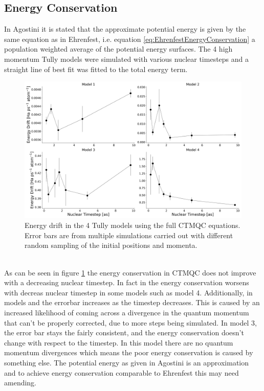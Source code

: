 \subsection{Energy Conservation}
In Agostini \cite{agostini_quantum-classical_2016} it is stated that the approximate potential energy is given by the same equation as in Ehrenfest, i.e. equation \eqref{eq:EhrenfestEnergyConservation} a population weighted average of the potential energy surfaces. The 4 high momentum Tully models were simulated with various nuclear timesteps and a straight line of best fit was fitted to the total energy term.
\begin{figure}[ht]
  \includegraphics[width=\textwidth]{../img/CTMQC/TullyModels/CTMQC_EnerCons.png}
  \caption{\label{fig:CTMQC_EnergyCons}Energy drift in the 4 Tully models using the full CTMQC equations. Error bars are from multiple simulations carried out with different random sampling of the initial positions and momenta.}
\end{figure}
\\
As can be seen in figure \ref{fig:CTMQC_EnergyCons} the energy conservation in CTMQC does not improve with a decreasing nuclear timestep. In fact in the energy conservation worsens with decreas nuclear timestep in some models such as model 4. Additionally, in models  and  the errorbar increases as the timestep decreases. This is caused by an increased likelihood of coming across a divergence in the quantum momentum that can't be properly corrected, due to more steps being simulated. In model 3, the error bar stays the fairly consistent, and the energy conservation doesn't change with respect to the timestep. In this model there are no quantum momentum divergences which means the poor energy conservation is caused by something else. The potential energy as given in Agostini \cite{agostini_quantum-classical_2016} is an approximation and to achieve energy conservation comparable to Ehrenfest this may need amending.

